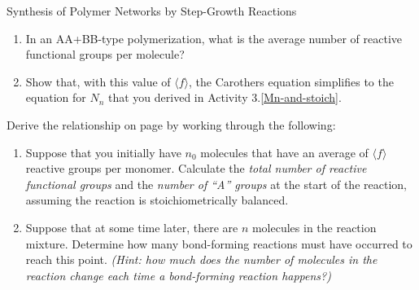 \begin{activity}[extension]{Synthesis of Polymer Networks by Step-Growth Reactions}
\begin{exercises}
		\begin{enumerate}
			\item In an AA+BB-type polymerization, what is the average number of reactive functional groups per molecule?
			
				\begin{solution}\end{solution}
			
			\item Show that, with this value of $\langle f\rangle$, the Carothers equation simplifies to the equation for $N_n$ that you derived in Activity 3.\ref{Mn-and-stoich}.
			
				\begin{solution}\end{solution}
		\end{enumerate}	
		
	\exercise \label{\labelbase:exc:Nn} Derive the relationship on page \pageref{\labelbase:eqn:carothers} by working through the following:
	
		\begin{enumerate}
			\item Suppose that you initially have $n_0$ molecules that have an average of $\langle f\rangle$ reactive groups per monomer.  				Calculate the \emph{total number of reactive functional groups} and the \emph{number of ``A'' groups} at the start of the reaction, assuming the reaction is stoichiometrically balanced.
			
			\begin{solution}\end{solution}
			
			\item Suppose that at some time later, there are $n$ molecules in the reaction mixture.  Determine how many bond-forming reactions must have occurred to reach this point.  \emph{(Hint: how much does the number of molecules in the reaction change each time a bond-forming reaction happens?)}
			
				\begin{solution}
\end{solution}
\end{enumerate}
\end{exercises}
\end{activity}
